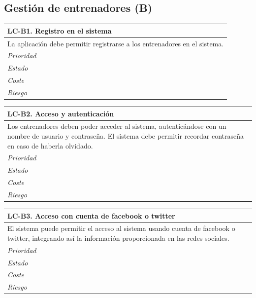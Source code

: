 % 
%
\subsection{Gestión de entrenadores (B)} %
	\label{sub:gestion_de_entrenadores}
	
	\begin{center}
		\begin{tabularx}{15cm}{|X|}
			\hline 
				\bf{LC-B1. Registro en el sistema}\\
			\hline
				La aplicación debe permitir registrarse a los entrenadores en el sistema.\\
			\hline
				\it{Prioridad}\\
			\hline
				\it{Estado}\\
			\hline
				\it{Coste}\\
			\hline
				\it{Riesgo}\\
			\hline
		\end{tabularx}
	\end{center}
	
	\begin{center}
		\begin{tabularx}{15cm}{|X|}
			\hline 
				\bf{LC-B2. Acceso y autenticación}\\
			\hline
				Los entrenadores deben poder acceder al sistema, autenticándose con un nombre de usuario y contraseña. El sistema debe permitir recordar contraseña en caso de haberla olvidado.\\
			\hline
				\it{Prioridad}\\
			\hline
				\it{Estado}\\
			\hline
				\it{Coste}\\
			\hline
				\it{Riesgo}\\
			\hline
		\end{tabularx}
	\end{center}

	\begin{center}
		\begin{tabularx}{15cm}{|X|}
			\hline 
				\bf{LC-B3. Acceso con cuenta de facebook o twitter}\\
			\hline
				El sistema puede permitir el acceso al sistema usando cuenta de facebook o twitter, integrando así la información proporcionada en las redes sociales.\\
			\hline
				\it{Prioridad}\\
			\hline
				\it{Estado}\\
			\hline
				\it{Coste}\\
			\hline
				\it{Riesgo}\\
			\hline
		\end{tabularx}
	\end{center}
	

